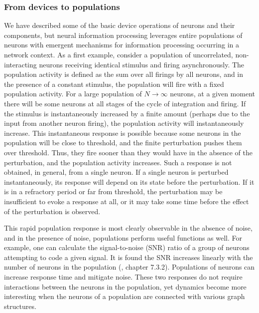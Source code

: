 \documentclass[twocolumn]{article}
\begin{document}
\subsubsection{\label{sec:populations}From devices to populations}
We have described some of the basic device operations of neurons and their components, but neural information processing leverages entire populations of neurons with emergent mechanisms for information processing occurring in a network context. As a first example, consider a population of uncorrelated, non-interacting neurons receiving identical stimulus and firing asynchronously. The population activity is defined as the sum over all firings by all neurons, and in the presence of a constant stimulus, the population will fire with a fixed population activity. For a large population of $N\longrightarrow\infty$ neurons, at a given moment there will be some neurons  at all stages of the cycle of integration and firing. If the stimulus is instantaneously increased by a finite amount (perhaps due to the input from another neuron firing), the population activity will instantaneously increase. This instantaneous response is possible because some neurons in the population will be close to threshold, and the finite perturbation pushes them over threshold. Thus, they fire sooner than they would have in the absence of the perturbation, and the population activity increases. Such a response is not obtained, in general, from a single neuron. If a single neuron is perturbed instantaneously, its response will depend on its state before the perturbation. If it is in a refractory period or far from threshold, the perturbation may be insufficient to evoke a response at all, or it may take some time before the effect of the perturbation is observed.

This rapid population response is most clearly observable in the absence of noise, and in the presence of noise, populations perform useful functions as well. For example, one can calculate the signal-to-noise (SNR) ratio of a group of neurons attempting to code a given signal. It is found the SNR increases linearly with the number of neurons in the population (\cite{geki2002}, chapter 7.3.2). Populations of neurons can increase response time and mitigate noise. These two responses do not require interactions between the neurons in the population, yet dynamics become more interesting when the neurons of a population are connected with various graph structures.
\end{document}
